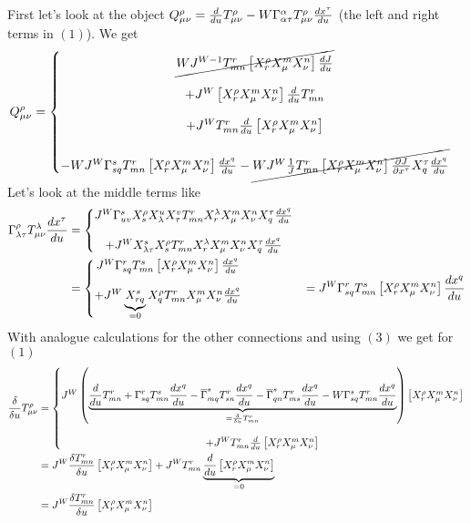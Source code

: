 First let's look at the object $Q^{\rho}_{\mu\nu} = \dv{}{u}T^{\rho}_{\mu\nu}-W\Gamma^{\alpha}_{\alpha\tau}T^{\rho}_{\mu\nu}\dv{x^{\tau}}{u}$ (the left and right terms in $(1)$).
We get
\begin{align}
Q^{\rho}_{\mu\nu}&=\left\{\begin{matrix} 
\cancel{WJ^{W-1}T^r_{mn} \left[X^{\rho}_{r}X^{m}_{\mu}X^{n}_{\nu}\right]\dv{J}{u}}\\\\ 
+J^W  \left[X^{\rho}_{r}X^{m}_{\mu}X^{n}_{\nu}\right]\dv{}{u}T^r_{mn}\\\\
+J^W T^r_{mn} \dv{}{u}\left[X^{\rho}_{r}X^{m}_{\mu}X^{n}_{\nu}\right]\\\\
-WJ^W\Gamma^s_{sq}T^r_{mn} \left[X^{\rho}_{r}X^{m}_{\mu}X^{n}_{\nu}\right]\dv{x^q}{u}-\cancel{ WJ^W\frac{1}{J}T^r_{mn} \left[X^{\rho}_{r}X^{m}_{\mu}X^{n}_{\nu}\right]\pdv{J}{x^{\tau}}X^{\tau}_{q}\dv{x^q}{u}}
\end{matrix}\right.
\end{align}
Let's look at the middle terms like 
\begin{align}
\Gamma^{\rho}_{\lambda\tau}T^{\lambda}_{\mu\nu}\dv{x^{\tau}}{u}&= \left\{\begin{matrix} 
J^W \Gamma^{s}_{uv} X^{\rho}_{s}X^{u}_{\lambda}X^{v}_{\tau}T^r_{mn} X^{\lambda}_{r}X^{m}_{\mu}X^{n}_{\nu}X^{\tau}_{q}\dv{x^q}{u}\\\\
+J^W X^s_{\lambda\tau}X^{\rho}_sT^r_{mn} X^{\lambda}_{r}X^{m}_{\mu}X^{n}_{\nu}X^{\tau}_{q}\dv{x^q}{u}
\end{matrix}\right.\\
&= \left\{\begin{matrix} 
J^W \Gamma^{r}_{sq} T^s_{mn}\left[X^{\rho}_{r}X^{m}_{\mu}X^{n}_{\nu}\right]\dv{x^q}{u}\\\\
+J^W \underbrace{X^s_{rq}}_{=0}X^{\rho}_qT^r_{mn} X^{m}_{\mu}X^{n}_{\nu}\dv{x^q}{u}
\end{matrix}\right.
&= 
J^W \Gamma^{r}_{sq} T^s_{mn}\left[X^{\rho}_{r}X^{m}_{\mu}X^{n}_{\nu}\right]\dv{x^q}{u}
\end{align}
With analogue calculations for the other connections and using $(3)$ we get for $(1)$
\begin{align}
\fdv{}{u}T^{\rho}_{\mu\nu} &= 
\left\{\begin{matrix}
J^W \left(\underbrace{\dv{}{u}T^r_{mn} + \Gamma^{r}_{sq} T^s_{mn}\dv{x^q}{u}- {\overline\Gamma}^{s}_{mq} T^r_{sn}\dv{x^q}{u}- {\overline\Gamma}^{s}_{qn} T^r_{ms}\dv{x^q}{u}-W\Gamma^s_{sq}T^r_{mn} \dv{x^q}{u}}_{=\fdv{}{u}T^r_{mn}}\right)\left[X^{\rho}_{r}X^{m}_{\mu}X^{n}_{\nu}\right]\\\\+J^W T^r_{mn} \dv{}{u}\left[X^{\rho}_{r}X^{m}_{\mu}X^{n}_{\nu}\right]
\end{matrix}\right.\\
&= 
J^W \fdv{T^r_{mn}}{u}\left[X^{\rho}_{r}X^{m}_{\mu}X^{n}_{\nu}\right]+J^W T^r_{mn} \underbrace{\dv{}{u}\left[X^{\rho}_{r}X^{m}_{\mu}X^{n}_{\nu}\right]}_{=0}\\
&= 
J^W \fdv{T^r_{mn}}{u}\left[X^{\rho}_{r}X^{m}_{\mu}X^{n}_{\nu}\right]
\end{align}
